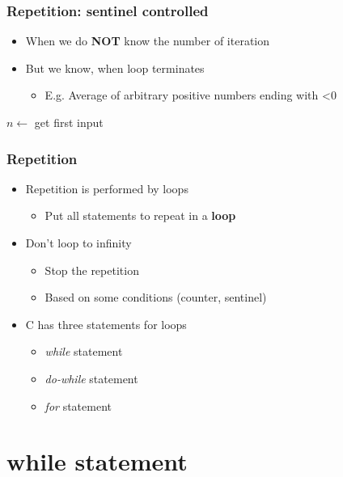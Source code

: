 \documentclass{../c-lecture}
\begin{document}
\begin{frame}
  \frametitle{Repetition: sentinel controlled}
  \begin{itemize}
    \item
      When we do \textbf{\color{RubineRed} NOT} know the number of iteration
    \item But we know, when loop terminates
    \begin{itemize}
      \item E.g. Average of arbitrary positive numbers ending with <0
    \end{itemize}
  \end{itemize}
  \begin{algorithm}[H]
  \KwData{}
  \KwResult{}
  $n \gets$ get first input\;

  \end{algorithm}
\end{frame}

\begin{frame}
  \frametitle{Repetition}
  \begin{itemize}
    \item Repetition is performed by loops
    \begin{itemize}
      \item
        Put all statements to repeat in a \textbf{\color{Orange} loop}
    \end{itemize}
    \item Don’t loop to infinity
    \begin{itemize}
      \item Stop the repetition
      \item Based on some conditions (counter, sentinel)
    \end{itemize}
    \item C has three statements for loops
    \begin{itemize}
      \item \textit{\color{Orange} while} statement
      \item \textit{\color{Orange} do-while} statement
      \item \textit{\color{Orange} for} statement
    \end{itemize}
  \end{itemize}
\end{frame}

\section{while statement}
\end{document}

